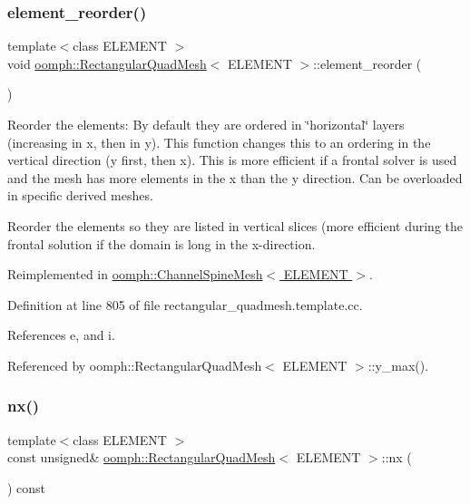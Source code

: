 \subsubsection{\texorpdfstring{element\+\_\+reorder()}{element\_reorder()}}
{\footnotesize\ttfamily template$<$class E\+L\+E\+M\+E\+NT $>$ \\
void \hyperlink{classoomph_1_1RectangularQuadMesh}{oomph\+::\+Rectangular\+Quad\+Mesh}$<$ E\+L\+E\+M\+E\+NT $>$\+::element\+\_\+reorder (\begin{DoxyParamCaption}{ }\end{DoxyParamCaption})\hspace{0.3cm}{\ttfamily [virtual]}}



Reorder the elements\+: By default they are ordered in \char`\"{}horizontal\char`\"{} layers (increasing in x, then in y). This function changes this to an ordering in the vertical direction (y first, then x). This is more efficient if a frontal solver is used and the mesh has more elements in the x than the y direction. Can be overloaded in specific derived meshes. 

Reorder the elements so they are listed in vertical slices (more efficient during the frontal solution if the domain is long in the x-\/direction. 

Reimplemented in \hyperlink{classoomph_1_1ChannelSpineMesh_ad449460c4d06b2be64b53097143a3b09}{oomph\+::\+Channel\+Spine\+Mesh$<$ E\+L\+E\+M\+E\+N\+T $>$}.



Definition at line 805 of file rectangular\+\_\+quadmesh.\+template.\+cc.



References e, and i.



Referenced by oomph\+::\+Rectangular\+Quad\+Mesh$<$ E\+L\+E\+M\+E\+N\+T $>$\+::y\+\_\+max().

\mbox{\label{classoomph_1_1RectangularQuadMesh_abfef93d6322886cdce14a437186e4821}} 
\subsubsection{\texorpdfstring{nx()}{nx()}}
{\footnotesize\ttfamily template$<$class E\+L\+E\+M\+E\+NT $>$ \\
const unsigned\& \hyperlink{classoomph_1_1RectangularQuadMesh}{oomph\+::\+Rectangular\+Quad\+Mesh}$<$ E\+L\+E\+M\+E\+NT $>$\+::nx (\begin{DoxyParamCaption}{ }\end{DoxyParamCaption}) const\hspace{0.3cm}{\ttfamily [inline]}}



